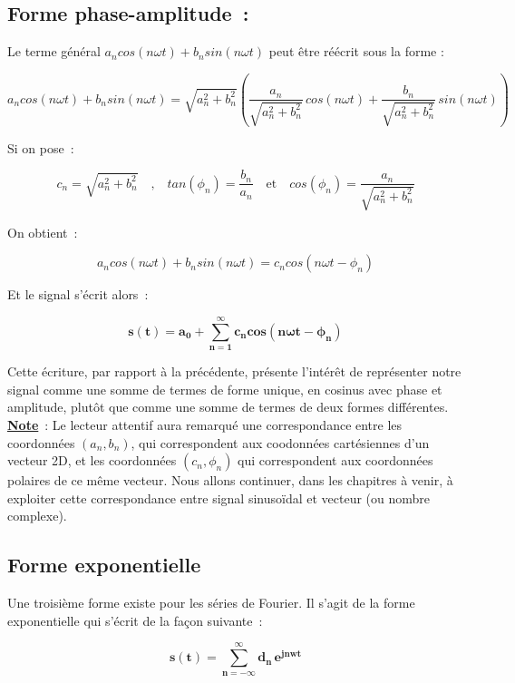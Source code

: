 \subsection*{Forme phase-amplitude~:}

Le terme général $a_n cos( n \omega t ) + b_n sin( n \omega t )$ peut être réécrit sous la forme : 

$$ a_ncos(n\omega t)+b_nsin(n\omega t) = \sqrt{a_n^2+b_n^2}\left(\dfrac{a_n}{\sqrt{a_n^2+b_n^2}}\,cos(n\omega t) + \dfrac{b_n}{\sqrt{a_n^2+b_n^2}}\,sin(n\omega t)\right)$$

Si on pose~:

$$c_n = \sqrt{a_n^2+b_n^2} \quad\text{,}\quad tan(\phi_n) = \dfrac{b_n}{a_n} \quad\text{et}\quad cos(\phi_n)= \dfrac{a_n}{\sqrt{a_n^2+b_n^2}}$$

On obtient~:

$$ a_ncos(n\omega t)+b_nsin(n\omega t) = c_n cos( n \omega t - \phi_n ) $$ 

Et le signal s'écrit alors~:

\begin{equation}
\bm{s(t)= a_0 + \sum_{n=1}^{\infty} c_n cos( n \omega t - \phi_n )} 
\end{equation}

Cette écriture, par rapport à la précédente, présente l'intérêt de représenter notre signal comme une somme de termes de forme unique, en cosinus avec phase et amplitude, plutôt que comme une somme de termes de deux formes différentes. \\

\textbf{\underline{Note}}~: Le lecteur attentif aura remarqué une correspondance entre les coordonnées $(a_n,b_n)$, qui correspondent aux coodonnées cartésiennes d'un vecteur 2D, et les coordonnées $(c_n, \phi_n)$ qui correspondent aux coordonnées polaires de ce même vecteur. Nous allons continuer, dans les chapitres à venir, à exploiter cette correspondance entre signal sinusoïdal et vecteur (ou nombre complexe).

\subsection*{Forme exponentielle}

Une troisième forme existe pour les séries de Fourier. Il s'agit de la forme exponentielle qui s'écrit de la façon suivante~:

\begin{equation}
\bm{s(t) = \sum_{n=-\infty}^{\infty} d_n\,e^{jnwt} }
\end{equation}

